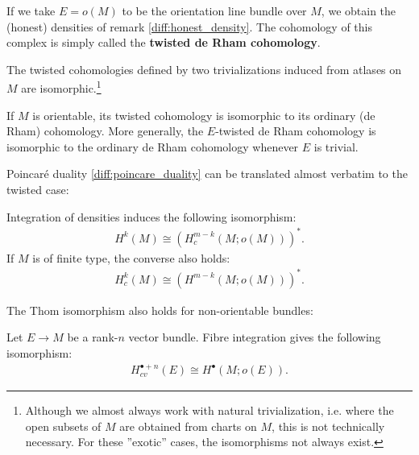    If we take $E=o(M)$ to be the orientation line bundle over $M$, we obtain the (honest) densities of remark \ref{diff:honest_density}. The cohomology of this complex is simply called the \textbf{twisted de Rham cohomology}.
    \begin{property}[Isomorphisms]
        The twisted cohomologies defined by two trivializations induced from atlases on $M$ are isomorphic.\footnote{Although we almost always work with natural trivialization, i.e. where the open subsets of $M$ are obtained from charts on $M$, this is not technically necessary. For these ''exotic'' cases, the isomorphisms not always exist.}
    \end{property}
    \begin{property}
        If $M$ is orientable, its twisted cohomology is isomorphic to its ordinary (de Rham) cohomology. More generally, the $E$-twisted de Rham cohomology is isomorphic to the ordinary de Rham cohomology whenever $E$ is trivial.
    \end{property}

    Poincar\'e duality \ref{diff:poincare_duality} can be translated almost verbatim to the twisted case:
    \begin{theorem}
        Integration of densities induces the following isomorphism:
        \begin{gather}
            H^k(M)\cong\left(H^{m-k}_c(M; o(M))\right)^*.
        \end{gather}
        If $M$ is of finite type, the converse also holds:
        \begin{gather}
            H^k_c(M)\cong\left(H^{m-k}(M; o(M))\right)^*.
        \end{gather}
    \end{theorem}
    The Thom isomorphism also holds for non-orientable bundles:
    \begin{theorem}
        Let $E\rightarrow M$ be a rank-$n$ vector bundle. Fibre integration gives the following isomorphism:
        \begin{gather}
            H^{\bullet+n}_{cv}(E)\cong H^\bullet(M; o(E)).
        \end{gather}
    \end{theorem}